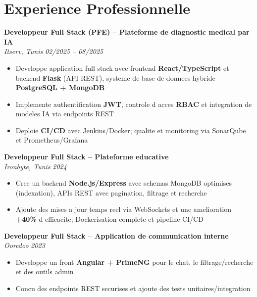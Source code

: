 \documentclass[10pt,a4paper]{article}
\begin{document}
\vspace{6pt}

\section*{Experience Professionnelle}
{\small

\textbf{Developpeur Full Stack (PFE) -- Plateforme de diagnostic medical par IA}\\[1pt]
\textit{Itserv, Tunis} \hfill \textit{02/2025 -- 08/2025}
\begin{itemize}
  \item Developpe application full stack avec frontend \textbf{React/TypeScript} et backend \textbf{Flask} (API REST), systeme de base de donnees hybride \textbf{PostgreSQL + MongoDB}
  \item Implemente authentification \textbf{JWT}, controle d acces \textbf{RBAC} et integration de modeles IA via endpoints REST
  \item Deploie \textbf{CI/CD} avec Jenkins/Docker; qualite et monitoring via SonarQube et Prometheus/Grafana
\end{itemize}

\vspace{3pt}
\textbf{Developpeur Full Stack -- Plateforme educative}\\[1pt]
\textit{Ironbyte, Tunis} \hfill \textit{2024}
\begin{itemize}
  \item Cree un backend \textbf{Node.js/Express} avec schemas MongoDB optimises (indexation), APIs REST avec pagination, filtrage et recherche
  \item Ajoute des mises a jour temps reel via WebSockets et une amelioration \textbf{+40\%} d efficacite; Dockerisation complete et pipeline CI/CD
\end{itemize}

\vspace{3pt}
\textbf{Developpeur Full Stack -- Application de communication interne}\\[1pt]
\textit{Ooredoo} \hfill \textit{2023}
\begin{itemize}
  \item Developpe un front \textbf{Angular + PrimeNG} pour le chat, le filtrage/recherche et des outils admin
  \item Concu des endpoints REST securises et ajoute des tests unitaires/integration
\end{itemize}

}
\end{document}
